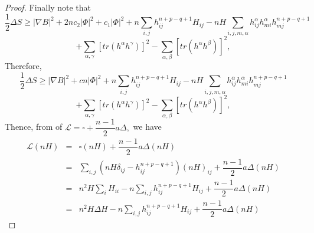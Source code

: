 \documentclass[10pt,a4paper]{amsart}
\begin{document}
\begin{proof}
Finally note that
$$
\dfrac{1}{2}\Delta S\geq |\nabla B|^2+2nc_2|\Phi|^2+c_1|\Phi|^2+n\sum_{i,j}h_{ij}^{n+p-q+1}H_{ij}-nH\sum_{i,j,m,\alpha}h_{ij}^{\alpha}h_{mi}^{\alpha}h_{mj}^{n+p-q+1}
$$
$$
+\sum_{\alpha,\gamma}[tr(h^{\alpha}h^{\gamma})]^2-\sum_{\alpha,\beta}[tr(h^{\alpha}h^{\beta})]^2,
$$
Therefore,
\begin{equation}\label{deltaS-inequalite}
\dfrac{1}{2}\Delta S\geq |\nabla B|^2+cn|\Phi|^2+n\sum_{i,j}h_{ij}^{n+p-q+1}H_{ij}-nH\sum_{i,j,m,\alpha}h_{ij}^{\alpha}h_{mi}^{\alpha}h_{mj}^{n+p-q+1}
\end{equation}
$$
+\sum_{\alpha,\gamma}[tr(h^{\alpha}h^{\gamma})]^2-\sum_{\alpha,\beta}[tr(h^{\alpha}h^{\beta})]^2,
$$
Thence, from of $\mathcal{L}=\square+\dfrac{n-1}{2}a\Delta,$ we have
\begin{eqnarray*}
\mathcal{L}(nH)&=&\square (nH)+\dfrac{n-1}{2}a\Delta  (nH)\\
&=&\sum_{i,j}(nH\delta_{ij}-h_{ij}^{n+p-q+1})(nH)_{ij}+\dfrac{n-1}{2}a\Delta(nH)\\
&=&n^2H\sum_{i}H_{ii}-n\sum_{i,j}h_{ij}^{n+p-q+1}H_{ij}+\dfrac{n-1}{2}a\Delta (nH)\\
&=&n^2H\Delta H-n\sum_{i,j}h_{ij}^{n+p-q+1}H_{ij}+\dfrac{n-1}{2}a\Delta (nH)
\end{eqnarray*}


\end{proof}
\end{document}
